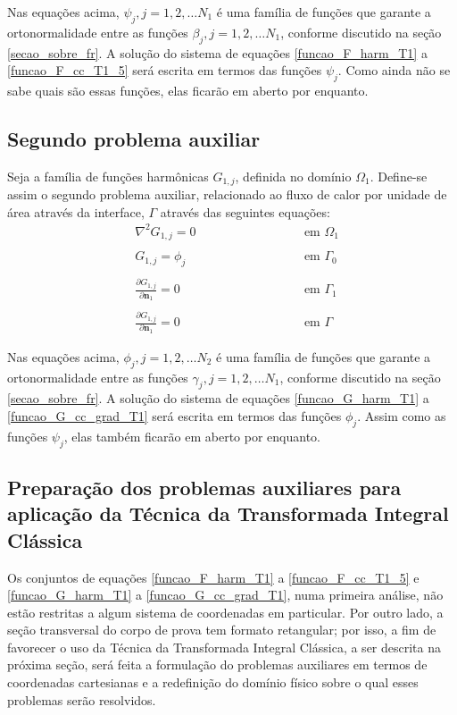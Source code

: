 Nas equações acima, $\psi_j, j=1,2,\ldots N_1$ é uma família de funções que garante a ortonormalidade entre as funções $\beta_j, j=1,2,\ldots N_1$, conforme discutido
na seção \ref{secao_sobre_fr}. 
A solução do sistema de equações \eqref{funcao_F_harm_T1} a \eqref{funcao_F_cc_T1_5} será escrita em termos das funções $\psi_j$.
Como ainda não se sabe quais são essas funções, elas ficarão em aberto por enquanto. 

\subsection{Segundo problema auxiliar}\label{secao_do_segundo}
Seja a família de funções harmônicas $G_{1, j}$, definida no domínio $\Omega_1$. Define-se assim o segundo
problema auxiliar, relacionado ao fluxo de calor por unidade de área através da interface, $\Gamma$ através das seguintes equações:
\begin{subequations}
	\begin{alignat}{2}
	& \nabla^2 G_{1,j} = 0 \quad\quad\quad\quad\quad && \text{ em } \Omega_1 \label{funcao_G_harm_T1} \\ \nonumber \\
	& G_{1,j} = \phi_j && \text{ em } \Gamma_0  \label{funcao_G_cc_T1_2} \\ \nonumber \\
	& \frac{\partial G_{1,j}}{\partial \mathbf{n}_1} = 0 && \text{ em }  \Gamma_1 \label{funcao_G_cc_T1_1} \\ \nonumber \\
	& \frac{\partial G_{1,j}}{\partial\mathbf{n}_1} = 0 \quad\quad\quad\quad\quad\quad\quad\quad && \text{ em }  \Gamma \label{funcao_G_cc_grad_T1}
	\end{alignat}
\end{subequations}

Nas equações acima, $\phi_j, j=1,2,\ldots N_2$ é uma família de funções que garante a ortonormalidade entre as funções $\gamma_j, j=1,2,\ldots N_1$, conforme discutido
na seção \ref{secao_sobre_fr}. A solução do sistema de equações \eqref{funcao_G_harm_T1} a \eqref{funcao_G_cc_grad_T1} será escrita em termos das funções $\phi_j$.
Assim como as funções $\psi_j$, elas também ficarão em aberto por enquanto.

\subsection{Preparação dos problemas auxiliares para aplicação da Técnica da Transformada Integral Clássica}
Os conjuntos de equações \eqref{funcao_F_harm_T1} a \eqref{funcao_F_cc_T1_5} e \eqref{funcao_G_harm_T1} a \eqref{funcao_G_cc_grad_T1}, numa primeira análise,
não estão restritas a algum sistema de coordenadas em particular. Por outro lado, a seção transversal do corpo de prova tem formato retangular; por isso,
a fim de favorecer o uso da Técnica da Transformada Integral Clássica, a ser descrita na próxima seção,
será feita a formulação do problemas auxiliares em termos de coordenadas cartesianas e a redefinição do domínio físico sobre o qual esses problemas
serão resolvidos.

